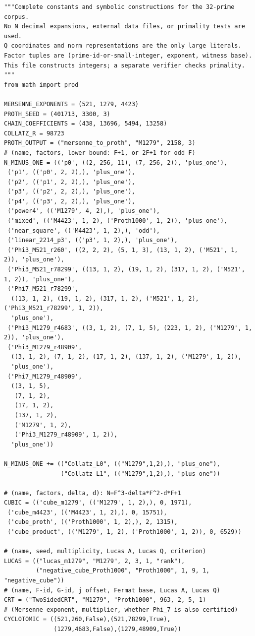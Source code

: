 \documentclass[11pt,a4paper]{article}
\theoremstyle{definition}\newtheorem{definition}[theorem]{Definition}
\theoremstyle{remark}\newtheorem{remark}[theorem]{Remark}
\begin{document}
\begin{lstlisting}[label=lst:verifier]
"""Complete constants and symbolic constructions for the 32-prime corpus.
No N decimal expansions, external data files, or primality tests are used.
Q coordinates and norm representations are the only large literals.
Factor tuples are (prime-id-or-small-integer, exponent, witness base).
This file constructs integers; a separate verifier checks primality.
"""
from math import prod

MERSENNE_EXPONENTS = (521, 1279, 4423)
PROTH_SEED = (401713, 3300, 3)
CHAIN_COEFFICIENTS = (438, 13696, 5494, 13258)
COLLATZ_R = 98723
PROTH_OUTPUT = ("mersenne_to_proth", "M1279", 2158, 3)
# (name, factors, lower bound: F+1, or 2F+1 for odd F)
N_MINUS_ONE = (('p0', ((2, 256, 11), (7, 256, 2)), 'plus_one'),
 ('p1', (('p0', 2, 2),), 'plus_one'),
 ('p2', (('p1', 2, 2),), 'plus_one'),
 ('p3', (('p2', 2, 2),), 'plus_one'),
 ('p4', (('p3', 2, 2),), 'plus_one'),
 ('power4', (('M1279', 4, 2),), 'plus_one'),
 ('mixed', (('M4423', 1, 2), ('Proth1000', 1, 2)), 'plus_one'),
 ('near_square', (('M4423', 1, 2),), 'odd'),
 ('linear_2214_p3', (('p3', 1, 2),), 'plus_one'),
 ('Phi3_M521_r260', ((2, 2, 2), (5, 1, 3), (13, 1, 2), ('M521', 1, 2)), 'plus_one'),
 ('Phi3_M521_r78299', ((13, 1, 2), (19, 1, 2), (317, 1, 2), ('M521', 1, 2)), 'plus_one'),
 ('Phi7_M521_r78299',
  ((13, 1, 2), (19, 1, 2), (317, 1, 2), ('M521', 1, 2), ('Phi3_M521_r78299', 1, 2)),
  'plus_one'),
 ('Phi3_M1279_r4683', ((3, 1, 2), (7, 1, 5), (223, 1, 2), ('M1279', 1, 2)), 'plus_one'),
 ('Phi3_M1279_r48909',
  ((3, 1, 2), (7, 1, 2), (17, 1, 2), (137, 1, 2), ('M1279', 1, 2)),
  'plus_one'),
 ('Phi7_M1279_r48909',
  ((3, 1, 5),
   (7, 1, 2),
   (17, 1, 2),
   (137, 1, 2),
   ('M1279', 1, 2),
   ('Phi3_M1279_r48909', 1, 2)),
  'plus_one'))

N_MINUS_ONE += (("Collatz_L0", (("M1279",1,2),), "plus_one"),
                ("Collatz_L1", (("M1279",1,2),), "plus_one"))

# (name, factors, delta, d): N=F^3-delta*F^2-d*F+1
CUBIC = (('cube_m1279', (('M1279', 1, 2),), 0, 1971),
 ('cube_m4423', (('M4423', 1, 2),), 0, 15751),
 ('cube_proth', (('Proth1000', 1, 2),), 2, 1315),
 ('cube_product', (('M1279', 1, 2), ('Proth1000', 1, 2)), 0, 6529))

# (name, seed, multiplicity, Lucas A, Lucas Q, criterion)
LUCAS = (("lucas_m1279", "M1279", 2, 3, 1, "rank"),
         ("negative_cube_Proth1000", "Proth1000", 1, 9, 1, "negative_cube"))
# (name, F-id, G-id, j offset, Fermat base, Lucas A, Lucas Q)
CRT = ("TwoSidedCRT", "M1279", "Proth1000", 963, 2, 5, 1)
# (Mersenne exponent, multiplier, whether Phi_7 is also certified)
CYCLOTOMIC = ((521,260,False),(521,78299,True),
              (1279,4683,False),(1279,48909,True))


\end{lstlisting}
\end{document}
